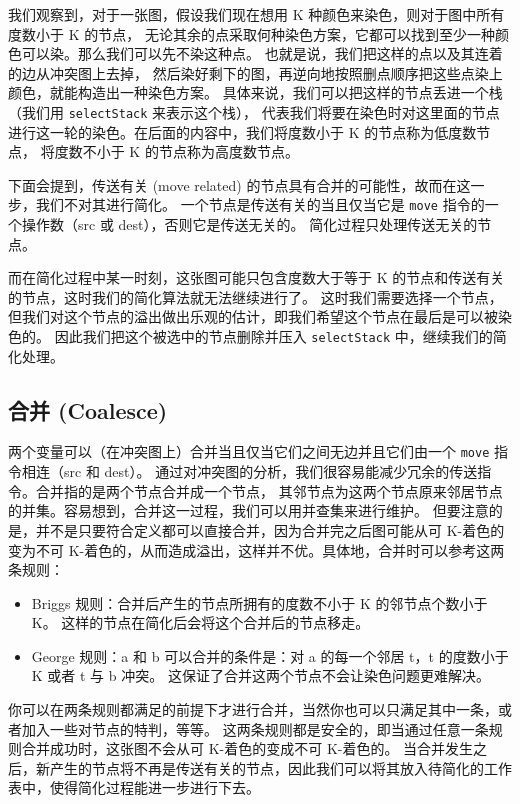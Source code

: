 我们观察到，对于一张图，假设我们现在想用 K 种颜色来染色，则对于图中所有度数小于 K 的节点，
无论其余的点采取何种染色方案，它都可以找到至少一种颜色可以染。那么我们可以先不染这种点。
也就是说，我们把这样的点以及其连着的边从冲突图上去掉，
然后染好剩下的图，再逆向地按照删点顺序把这些点染上颜色，就能构造出一种染色方案。
具体来说，我们可以把这样的节点丢进一个栈（我们用 \texttt{selectStack} 来表示这个栈），
代表我们将要在染色时对这里面的节点进行这一轮的染色。在后面的内容中，我们将度数小于 K 的节点称为低度数节点，
将度数不小于 K 的节点称为高度数节点。

下面会提到，传送有关 (move related) 的节点具有合并的可能性，故而在这一步，我们不对其进行简化。
一个节点是传送有关的当且仅当它是 \texttt{move} 指令的一个操作数（src 或 dest），否则它是传送无关的。
简化过程只处理传送无关的节点。

而在简化过程中某一时刻，这张图可能只包含度数大于等于 K 的节点和传送有关的节点，这时我们的简化算法就无法继续进行了。
这时我们需要选择一个节点，但我们对这个节点的溢出做出乐观的估计，即我们希望这个节点在最后是可以被染色的。
因此我们把这个被选中的节点删除并压入 \texttt{selectStack} 中，继续我们的简化处理。

\subsection{合并 (Coalesce)} \label{opt-graph-coalesce}

两个变量可以（在冲突图上）合并当且仅当它们之间无边并且它们由一个 \texttt{move} 指令相连（src 和 dest）。
通过对冲突图的分析，我们很容易能减少冗余的传送指令。合并指的是两个节点合并成一个节点，
其邻节点为这两个节点原来邻居节点的并集。容易想到，合并这一过程，我们可以用并查集来进行维护。
但要注意的是，并不是只要符合定义都可以直接合并，因为合并完之后图可能从可 K-着色的变为不可 K-着色的，从而造成溢出，这样并不优。具体地，合并时可以参考这两条规则：
\begin{itemize}
    \item Briggs 规则：合并后产生的节点所拥有的度数不小于 K 的邻节点个数小于 K。
        这样的节点在简化后会将这个合并后的节点移走。
    \item George 规则：a 和 b 可以合并的条件是：对 a 的每一个邻居 t，t 的度数小于 K 或者 t 与 b 冲突。
        这保证了合并这两个节点不会让染色问题更难解决。
\end{itemize}

你可以在两条规则都满足的前提下才进行合并，当然你也可以只满足其中一条，或者加入一些对节点的特判，等等。
这两条规则都是安全的，即当通过任意一条规则合并成功时，这张图不会从可 K-着色的变成不可 K-着色的。
当合并发生之后，新产生的节点将不再是传送有关的节点，因此我们可以将其放入待简化的工作表中，使得简化过程能进一步进行下去。

